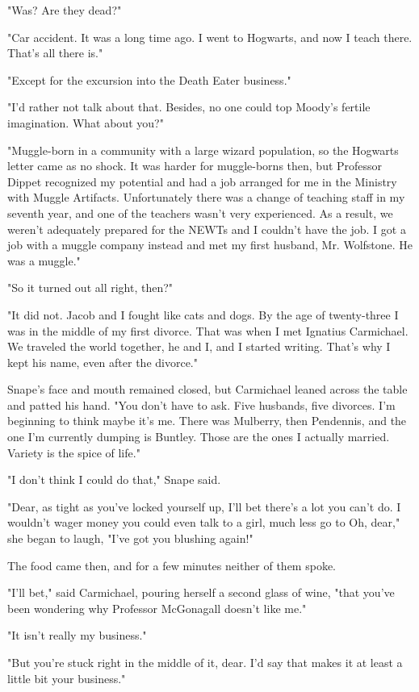 "Was? Are they dead?"

"Car accident. It was a long time ago. I went to Hogwarts, and now I teach there. That's all there is."

"Except for the excursion into the Death Eater business."

"I'd rather not talk about that. Besides, no one could top Moody's fertile imagination. What about you?"

"Muggle-born in a community with a large wizard population, so the Hogwarts letter came as no shock. It was harder for muggle-borns then, but Professor Dippet recognized my potential and had a job arranged for me in the Ministry with Muggle Artifacts. Unfortunately there was a change of teaching staff in my seventh year, and one of the teachers wasn't very experienced. As a result, we weren't adequately prepared for the NEWTs and I couldn't have the job. I got a job with a muggle company instead and met my first husband, Mr. Wolfstone. He was a muggle."

"So it turned out all right, then?"

"It did not. Jacob and I fought like cats and dogs. By the age of twenty-three I was in the middle of my first divorce. That was when I met Ignatius Carmichael. We traveled the world together, he and I, and I started writing. That's why I kept his name, even after the divorce."

Snape's face and mouth remained closed, but Carmichael leaned across the table and patted his hand. "You don't have to ask. Five husbands, five divorces. I'm beginning to think maybe it's me. There was Mulberry, then Pendennis, and the one I'm currently dumping is Buntley. Those are the ones I actually married. Variety is the spice of life."

"I don't think I could do that," Snape said.

"Dear, as tight as you've locked yourself up, I'll bet there's a lot you can't do. I wouldn't wager money you could even talk to a girl, much less go to{\el} Oh, dear," she began to laugh, "I've got you blushing again!"

The food came then, and for a few minutes neither of them spoke.

"I'll bet," said Carmichael, pouring herself a second glass of wine, "that you've been wondering why Professor McGonagall doesn't like me."

"It isn't really my business."

"But you're stuck right in the middle of it, dear. I'd say that makes it at least a little bit your business."

